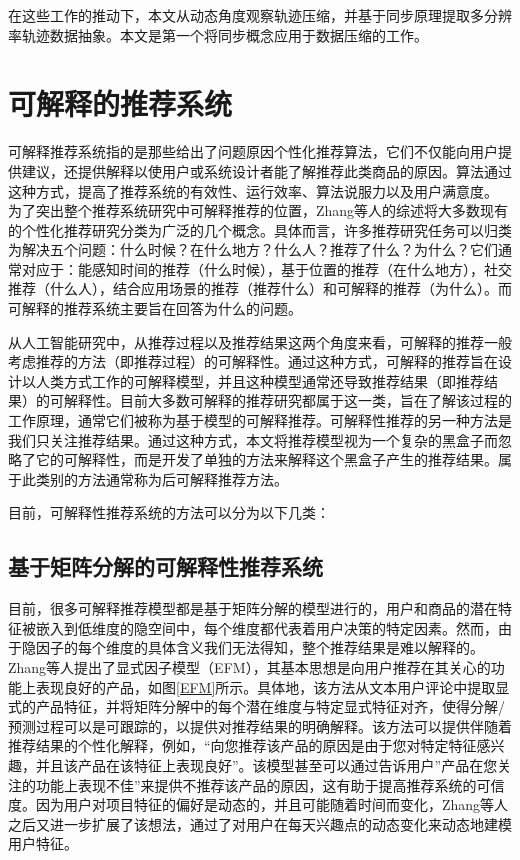 在这些工作的推动下，本文从动态角度观察轨迹压缩，并基于同步原理提取多分辨率轨迹数据抽象。本文是第一个将同步概念应用于数据压缩的工作。

\section{可解释的推荐系统}
可解释推荐系统指的是那些给出了问题原因个性化推荐算法，它们不仅能向用户提供建议，还提供解释以使用户或系统设计者能了解推荐此类商品的原因。算法通过这种方式，提高了推荐系统的有效性、运行效率、算法说服力以及用户满意度。
为了突出整个推荐系统研究中可解释推荐的位置，Zhang等人的综述将大多数现有的个性化推荐研究分类为广泛的几个概念。具体而言，许多推荐研究任务可以归类为解决五个问题：什么时候？在什么地方？什么人？推荐了什么？为什么？它们通常对应于：能感知时间的推荐（什么时候），基于位置的推荐（在什么地方），社交推荐（什么人），结合应用场景的推荐（推荐什么）和可解释的推荐（为什么）。而可解释的推荐系统主要旨在回答为什么的问题。

从人工智能研究中，从推荐过程以及推荐结果这两个角度来看，可解释的推荐一般考虑推荐的方法（即推荐过程）的可解释性。通过这种方式，可解释的推荐旨在设计以人类方式工作的可解释模型，并且这种模型通常还导致推荐结果（即推荐结果）的可解释性。目前大多数可解释的推荐研究都属于这一类，旨在了解该过程的工作原理，通常它们被称为基于模型的可解释推荐。可解释性推荐的另一种方法是我们只关注推荐结果。通过这种方式，本文将推荐模型视为一个复杂的黑盒子而忽略了它的可解释性，而是开发了单独的方法来解释这个黑盒子产生的推荐结果。属于此类别的方法通常称为后可解释推荐方法。

目前，可解释性推荐系统的方法可以分为以下几类：

\subsection{基于矩阵分解的可解释性推荐系统}
目前，很多可解释推荐模型都是基于矩阵分解的模型进行的，用户和商品的潜在特征被嵌入到低维度的隐空间中，每个维度都代表着用户决策的特定因素。然而，由于隐因子的每个维度的具体含义我们无法得知，整个推荐结果是难以解释的。Zhang等人提出了显式因子模型（EFM），其基本思想是向用户推荐在其关心的功能上表现良好的产品，如图\ref{EFM}所示。具体地，该方法从文本用户评论中提取显式的产品特征，并将矩阵分解中的每个潜在维度与特定显式特征对齐，使得分解/预测过程可以是可跟踪的，以提供对推荐结果的明确解释。该方法可以提供伴随着推荐结果的个性化解释，例如，“向您推荐该产品的原因是由于您对特定特征感兴趣，并且该产品在该特征上表现良好”。该模型甚至可以通过告诉用户”产品在您关注的功能上表现不佳”来提供不推荐该产品的原因，这有助于提高推荐系统的可信度。因为用户对项目特征的偏好是动态的，并且可能随着时间而变化，Zhang等人之后又进一步扩展了该想法，通过了对用户在每天兴趣点的动态变化来动态地建模用户特征。

